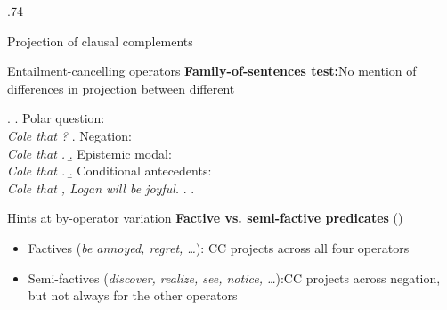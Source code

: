 \documentclass[final]{beamer}
\newlength{\colwidth}
\newlength{\vboxsep}
\begin{document}
\begin{frame}[t]
\begin{columns}[t]
\begin{column}{.74\colwidth}
\begin{normalbox}{Projection of clausal complements}
{\begin{minipage}{1.7\linewidth}
					\end{minipage}
				}
			\end{normalbox}

			\vspace{\vboxsep}
			\begin{normalbox}{Entailment-cancelling operators}
				\textbf{Family-of-sentences test:}\newline No mention of differences in projection between different 
				
				\vspace{-.5\baselineskip}
				\ex. \a. Polar question:\\
					\textit{ Cole  that ?}
					\b. Negation:\\
					\textit{Cole   that .}
					\b. Epistemic modal:\\
					\textit{ Cole  that .}
					\b. Conditional antecedents:\\
					\textit{ Cole  that , Logan will be joyful.}
					\z.
				\z.

				\vspace{-.5\baselineskip}

			\end{normalbox}
			
			\vspace{\vboxsep}
			\begin{normalbox}{Hints at by-operator variation}
				\textbf{Factive vs. semi-factive predicates} (\citealt{karttunen_observations_1971})
				\vspace{-.2\baselineskip}
				\begin{itemize}
					\item Factives (\textit{be annoyed, regret, \dots}): CC projects across all four operators
					\item Semi-factives (\textit{discover, realize, see, notice, \dots}):\newline CC projects across negation, but not always for the other operators
				\end{itemize}


\end{normalbox}
\end{column}
\end{columns}
\end{frame}
\end{document}
